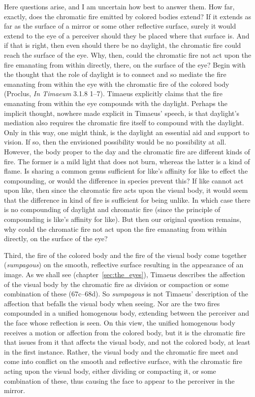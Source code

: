 Here questions arise, and I am uncertain how best to answer them. How far, exactly, does the chromatic fire emitted by colored bodies extend? If it extends as far as the surface of a mirror or some other reflective surface, surely it would extend to the eye of a perceiver should they be placed where that surface is. And if that is right, then even should there be no daylight, the chromatic fire could reach the surface of the eye. Why, then, could the chromatic fire not act upon the fire emanating from within directly, there, on the surface of the eye? Begin with the thought that the role of daylight is to connect and so mediate the fire emanating from within the eye with the chromatic fire of the colored body (Proclus, \emph{In Timaeum} 3.1.8 1--7). Timaeus explicitly claims that the fire emanating from within the eye compounds with the daylight. Perhaps the implicit thought, nowhere made explicit in Timaeus' speech, is that daylight's mediation also requires the chromatic fire itself to compound with the daylight. Only in this way, one might think, is the daylight an essential aid and support to vision. If so, then the envisioned possibility would be no possibility at all. However, the body proper to the day and the chromatic fire are different kinds of fire. The former is a mild light that does not burn, whereas the latter is a kind of flame. Is sharing a common genus sufficient for like's affinity for like to effect the compounding, or would the difference in species prevent this? If like cannot act upon like, then since the chromatic fire acts upon the visual body, it would seem that the difference in kind of fire is sufficient for being unlike. In which case there is no compounding of daylight and chromatic fire (since the principle of compounding is like's affinity for like). But then our original question remains, why could the chromatic fire not act upon the fire emanating from within directly, on the surface of the eye?

Third, the fire of the colored body and the fire of the visual body come together (\emph{sumpagous}) on the smooth, reflective surface resulting in the appearance of an image. As we shall see (chapter~\ref{sec:the_eyes}), Timaeus describes the affection of the visual body by the chromatic fire as division  or compaction or some combination of these (67c–68d). So \emph{sumpagous} is not Timaeus' description of the affection that befalls the visual body when seeing. Nor are the two fires compounded in a unified homogenous body, extending between the perceiver and the face whose reflection is seen. On this view, the unified homogenous body receives a motion or affection from the colored body, but it is the chromatic fire that issues from it that affects the visual body, and not the colored body, at least in the first instance.  Rather, the visual body and the chromatic fire meet and come into conflict on the smooth and reflective surface, with the chromatic fire acting upon the visual body, either dividing or compacting it, or some combination of these, thus causing the face to appear to the perceiver in the mirror.


